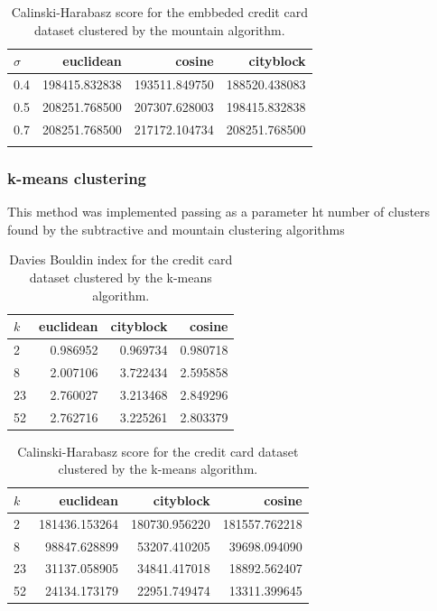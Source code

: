 \begin{table}[ht!]
    \centering
    \begin{tabular}{lrrr}
        \toprule
        $\sigma$ &      euclidean &         cosine &      cityblock \\
        \midrule
        0.4 &  198415.832838 &  193511.849750 &  188520.438083 \\
        0.5 &  208251.768500 &  207307.628003 &  198415.832838 \\
        0.7 &  208251.768500 &  217172.104734 &  208251.768500 \\
        \bottomrule \\
        \end{tabular}
    \caption{Calinski-Harabasz score for the embbeded credit card dataset clustered by the mountain algorithm.}
    \label{tab:ce_ch_m}
\end{table}

\subsubsection{k-means clustering}
This method was implemented passing as a parameter ht number of clusters found by the subtractive and mountain clustering algorithms

\begin{table}[ht!]
    \centering
   \begin{tabular}{lrrr}
\toprule
$k$ &  euclidean &  cityblock &    cosine \\
\midrule
2  &   0.986952 &   0.969734 &  0.980718 \\
8  &   2.007106 &   3.722434 &  2.595858 \\
23 &   2.760027 &   3.213468 &  2.849296 \\
52 &   2.762716 &   3.225261 &  2.803379 \\
\bottomrule
\end{tabular}
    \caption{Davies Bouldin index for the credit card dataset clustered by the k-means algorithm.}
    \label{tab:c1_db_k}
\end{table}

\begin{table}[ht!]
    \centering
    \begin{tabular}{lrrr}
\toprule
$k$ &      euclidean &      cityblock &         cosine \\
\midrule
2  &  181436.153264 &  180730.956220 &  181557.762218 \\
8  &   98847.628899 &   53207.410205 &   39698.094090 \\
23 &   31137.058905 &   34841.417018 &   18892.562407 \\
52 &   24134.173179 &   22951.749474 &   13311.399645 \\
\bottomrule
\end{tabular}

    \caption{Calinski-Harabasz score for the credit card dataset clustered by the k-means algorithm.}
    \label{tab:c1_ch_k}
\end{table}

